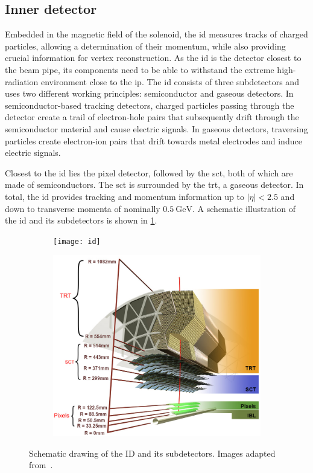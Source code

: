 \subsection{Inner detector}

Embedded in the magnetic field of the solenoid, the \gls{id} measures tracks of charged particles, allowing a determination of their momentum, while also providing crucial information for vertex reconstruction. As the \gls{id} is the detector closest to the beam pipe, its components need to be able to withstand the extreme high-radiation environment close to the \gls{ip}. The \gls{id} consists of three subdetectors and uses two different working principles: semiconductor and gaseous detectors. In semiconductor-based tracking detectors, charged particles passing through the detector create a trail of electron-hole pairs that subsequently drift through the semiconductor material and cause electric signals. In gaseous detectors, traversing particles create electron-ion pairs that drift towards metal electrodes and induce electric signals.

 Closest to the \gls{id} lies the pixel detector, followed by the \gls{sct}, both of which are made of semiconductors. The \gls{sct} is surrounded by the \gls{trt}, a gaseous detector. In total, the \gls{id} provides tracking and momentum information up to $\vert\eta\vert < 2.5$ and down to transverse momenta of nominally $\SI{0.5}{\GeV}$. A schematic illustration of the \gls{id} and its subdetectors is shown in \cref{fig:ID_schematic}. 

\begin{figure}
	\centering
	\begin{subfigure}[b]{0.45\linewidth}
		\centering\texttt{[image: id]}
	\end{subfigure}\hfill
	\begin{subfigure}[b]{0.45\linewidth}
		\centering\includegraphics[width=\textwidth]{ibl}
	\end{subfigure}%
	\caption{Schematic drawing of the ID and its subdetectors. Images adapted from~\cite{Pequenao:1095926, Potamianos:2209070}.}\label{fig:ID_schematic}
\end{figure}

